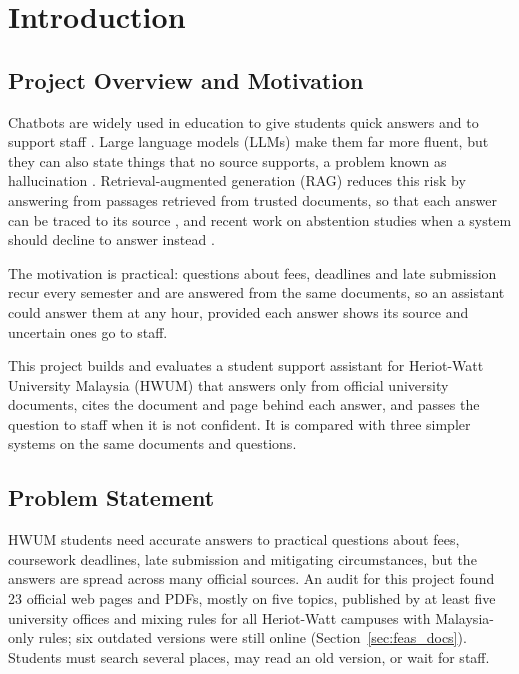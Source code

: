 \documentclass[12pt,nonacm,acmlarge,titlepage,screen]{acmart}
\begin{document}
\section{Introduction} \label{cha:intro}

\subsection{Project Overview and Motivation} \label{sec:intro_overview}

Chatbots are widely used in education to give students quick answers and to support staff \cite{okonkwo2021chatbots}. Large language models (LLMs) make them far more fluent, but they can also state things that no source supports, a problem known as hallucination \cite{ji2023survey}. Retrieval-augmented generation (RAG) reduces this risk by answering from passages retrieved from trusted documents, so that each answer can be traced to its source \cite{lewis2020rag, gao2023rag}, and recent work on abstention studies when a system should decline to answer instead \cite{wen2025know, peng2025unanswerability}.

The motivation is practical: questions about fees, deadlines and late submission recur every semester and are answered from the same documents, so an assistant could answer them at any hour, provided each answer shows its source and uncertain ones go to staff.

This project builds and evaluates a student support assistant for Heriot-Watt University Malaysia (HWUM) that answers only from official university documents, cites the document and page behind each answer, and passes the question to staff when it is not confident. It is compared with three simpler systems on the same documents and questions.

\subsection{Problem Statement} \label{sec:intro_problem}

HWUM students need accurate answers to practical questions about fees, coursework deadlines, late submission and mitigating circumstances, but the answers are spread across many official sources. An audit for this project found 23 official web pages and PDFs, mostly on five topics, published by at least five university offices and mixing rules for all Heriot-Watt campuses with Malaysia-only rules; six outdated versions were still online (Section~\ref{sec:feas_docs}). Students must search several places, may read an old version, or wait for staff.
\end{document}
